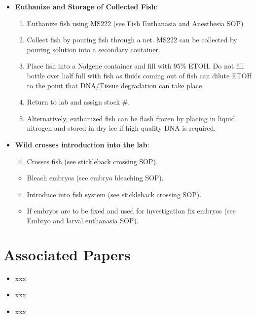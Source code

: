 \documentclass[
  letterpaper,
  DIV=11,
  numbers=noendperiod]{scrreprt}
\providecommand{\tightlist}{%
  \setlength{\itemsep}{0pt}\setlength{\parskip}{0pt}}\usepackage{longtable,booktabs,array}
\begin{document}
\begin{itemize}
\item
  \textbf{Euthanize and Storage of Collected Fish}:

  \begin{enumerate}
  \def\labelenumi{\arabic{enumi}.}
  \tightlist
  \item
    Euthanize fish using MS222 (see Fish Euthanasia and Anesthesia SOP)
  \item
    Collect fish by pouring fish through a net. MS222 can be collected
    by pouring solution into a secondary container.
  \item
    Place fish into a Nalgene container and fill with 95\% ETOH. Do not
    fill bottle over half full with fish as fluids coming out of fish
    can dilute ETOH to the point that DNA/Tissue degradation can take
    place.
  \item
    Return to lab and assign stock \#.
  \item
    Alternatively, euthanized fish can be flash frozen by placing in
    liquid nitrogen and stored in dry ice if high quality DNA is
    required.
  \end{enumerate}
\item
  \textbf{Wild crosses introduction into the lab}:

  \begin{itemize}
  \item
    Crosses fish (see stickleback crossing SOP).
  \item
    Bleach embryos (see embryo bleaching SOP).
  \item
    Introduce into fish system (see stickleback crossing SOP).
  \item
    If embryos are to be fixed and used for investigation fix embryos
    (see Embryo and larval euthanasia SOP).
  \end{itemize}
\end{itemize}

\hypertarget{associated-papers-44}{%
\section{Associated Papers}\label{associated-papers-44}}

\begin{itemize}
\tightlist
\item
  xxx
\item
  xxx
\item
  xxx
\end{itemize}
\end{document}
